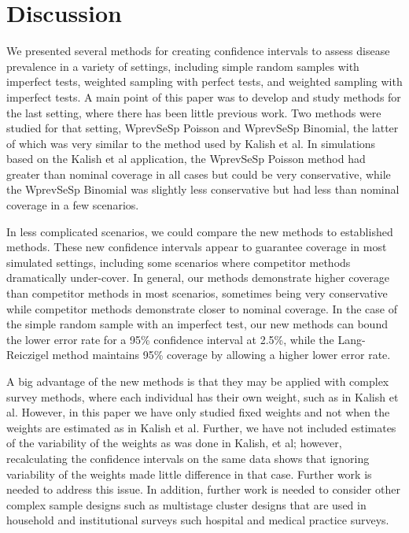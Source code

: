 \pagebreak

\section{Discussion}

We presented several methods for creating confidence intervals to assess disease prevalence in a variety of settings, including simple random samples with imperfect tests, weighted sampling with perfect tests, and weighted sampling with imperfect tests.
A main point of this paper was to develop and study methods for the last setting, where there has been little previous work.
Two methods were studied for that setting, WprevSeSp Poisson and WprevSeSp Binomial, the latter of which was very similar to the method used by Kalish et al.\cite{Kali:2021}
In simulations based on the Kalish et al application, the WprevSeSp Poisson method had greater than nominal coverage in all cases but could be very conservative, while the WprevSeSp Binomial was slightly less conservative but had less than nominal coverage in a few scenarios.

In less complicated scenarios, we could compare the new methods to established methods.
These new confidence intervals appear to guarantee coverage in most simulated settings, including some scenarios where competitor methods dramatically under-cover.
In general, our methods demonstrate higher coverage than competitor methods in most scenarios, sometimes being very conservative while competitor methods demonstrate closer to nominal coverage.
In the case of the simple random sample with an imperfect test, our new methods can bound the lower error rate for a 95\% confidence interval at 2.5\%, while the Lang-Reiczigel\cite{Lang:2014} method maintains 95\% coverage by allowing a higher lower error rate.

A big advantage of the new methods is that they may be applied with complex survey methods, where each individual has their own weight, such as in Kalish et al.\cite{Kali:2021}
However, in this paper we have only studied fixed weights and not when the weights are estimated as in Kalish et al.
Further, we have not included estimates of the variability of the weights as was done in Kalish, et al; however, recalculating the confidence intervals on the same data shows that ignoring variability of the weights made little difference in that case.
Further work is needed to address this issue. In addition, further work is needed to consider other complex sample designs such as multistage cluster designs that are used in household and institutional surveys such hospital and medical practice surveys.

